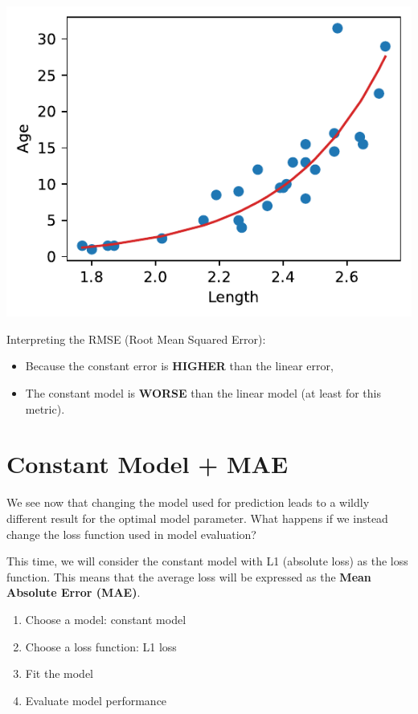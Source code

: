 \documentclass[
  letterpaper,
  DIV=11,
  numbers=noendperiod]{scrreprt}
\providecommand{\tightlist}{%
  \setlength{\itemsep}{0pt}\setlength{\parskip}{0pt}}\usepackage{longtable,booktabs,array}
\begin{document}
\includegraphics{constant_model_loss_transformations/loss_transformations_files/figure-pdf/cell-8-output-1.pdf}

Interpreting the RMSE (Root Mean Squared Error):

\begin{itemize}
\tightlist
\item
  Because the constant error is \textbf{HIGHER} than the linear error,
\item
  The constant model is \textbf{WORSE} than the linear model (at least
  for this metric).
\end{itemize}

\section{Constant Model + MAE}\label{constant-model-mae}

We see now that changing the model used for prediction leads to a wildly
different result for the optimal model parameter. What happens if we
instead change the loss function used in model evaluation?

This time, we will consider the constant model with L1 (absolute loss)
as the loss function. This means that the average loss will be expressed
as the \textbf{Mean Absolute Error (MAE)}.

\begin{enumerate}
\def\labelenumi{\arabic{enumi}.}
\tightlist
\item
  Choose a model: constant model
\item
  Choose a loss function: L1 loss
\item
  Fit the model
\item
  Evaluate model performance
\end{enumerate}
\end{document}
